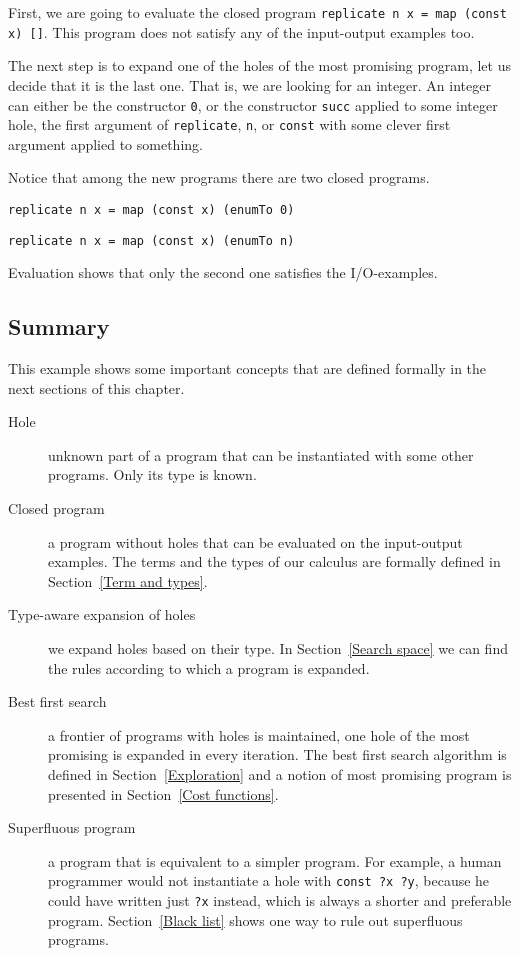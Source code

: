 First, we are going to evaluate the closed program \lstinline?replicate n x = map (const x) []?. This program does not satisfy any of the input-output examples too.

The next step is to expand one of the holes of the most promising program, let us decide that it is the last one. That is, we are looking for an integer. An integer can either be the constructor \lstinline?0?, or the constructor \lstinline?succ? applied to some integer hole, the first argument of \lstinline?replicate?, \lstinline?n?, or \lstinline?const? with some clever first argument applied to something.

Notice that among the new programs there are two closed programs.
\begin{lstlisting}
replicate n x = map (const x) (enumTo 0)
\end{lstlisting}
\begin{lstlisting}
replicate n x = map (const x) (enumTo n)
\end{lstlisting}
Evaluation shows that only the second one satisfies the I/O-examples.

\subsection{Summary}

This example shows some important concepts that are defined formally in the next sections of this chapter.
\begin{description}
\item[Hole] unknown part of a program that can be instantiated with some other programs. Only its type is known.
\item[Closed program] a program without holes that can be evaluated on the input-output examples. The terms and the types of our calculus are formally defined in Section~\ref{Term and types}.
\item[Type-aware expansion of holes] we expand holes based on their type. In Section~\ref{Search space} we can find the rules according to which a program is expanded.
\item[Best first search] a frontier of programs with holes is maintained, one hole of the most promising is expanded in every iteration. The best first search algorithm is defined in Section~\ref{Exploration} and a notion of most promising program is presented in Section~\ref{Cost functions}.
\item[Superfluous program] a program that is equivalent to a simpler program. For example, a human programmer would not instantiate a hole with \lstinline!const ?x ?y!, because he could have written just \lstinline!?x! instead, which is always a shorter and preferable program. Section~\ref{Black list} shows one way to rule out superfluous programs.
\end{description}
 
